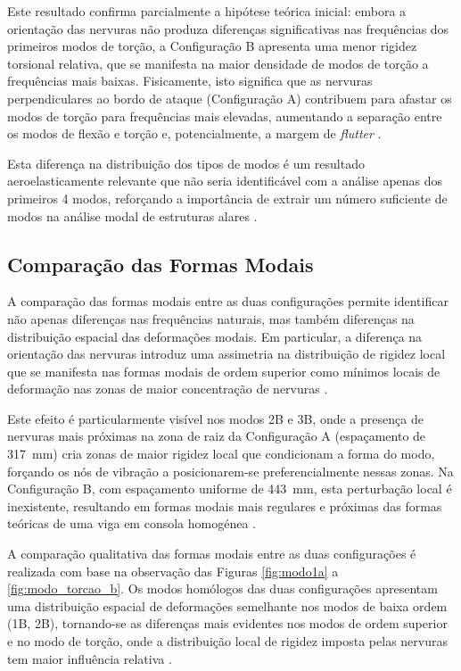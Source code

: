 \documentclass[11pt,oneside,a4paper,final]{report}
\begin{document}
Este resultado confirma parcialmente a hipótese teórica inicial: embora a orientação das nervuras não produza diferenças significativas nas frequências dos primeiros modos de torção, a Configuração B apresenta uma menor rigidez torsional relativa, que se manifesta na maior densidade de modos de torção a frequências mais baixas. Fisicamente, isto significa que as nervuras perpendiculares ao bordo de ataque (Configuração A) contribuem para afastar os modos de torção para frequências mais elevadas, aumentando a separação entre os modos de flexão e torção e, potencialmente, a margem de \textit{flutter} \cite{Fung1993, Wright2015}.

Esta diferença na distribuição dos tipos de modos é um resultado aeroelasticamente relevante que não seria identificável com a análise apenas dos primeiros 4 modos, reforçando a importância de extrair um número suficiente de modos na análise modal de estruturas alares \cite{Dowell2004, Craig2006}.

\subsection{Comparação das Formas Modais}

A comparação das formas modais entre as duas configurações permite identificar não apenas diferenças nas frequências naturais, mas também diferenças na distribuição espacial das deformações modais. Em particular, a diferença na orientação das nervuras introduz uma assimetria na distribuição de rigidez local que se manifesta nas formas modais de ordem superior como mínimos locais de deformação nas zonas de maior concentração de nervuras \cite{Bathe2014, Cook2001}.

Este efeito é particularmente visível nos modos 2B e 3B, onde a presença de nervuras mais próximas na zona de raiz da Configuração A (espaçamento de \SI{317}{\milli\meter}) cria zonas de maior rigidez local que condicionam a forma do modo, forçando os nós de vibração a posicionarem-se preferencialmente nessas zonas. Na Configuração B, com espaçamento uniforme de \SI{443}{\milli\meter}, esta perturbação local é inexistente, resultando em formas modais mais regulares e próximas das formas teóricas de uma viga em consola homogénea \cite{Rao2011}.

A comparação qualitativa das formas modais entre as duas configurações é realizada com base na observação das Figuras \ref{fig:modo1a} a \ref{fig:modo_torcao_b}. Os modos homólogos das duas configurações apresentam uma distribuição espacial de deformações semelhante nos modos de baixa ordem (1B, 2B), tornando-se as diferenças mais evidentes nos modos de ordem superior e no modo de torção, onde a distribuição local de rigidez imposta pelas nervuras tem maior influência relativa \cite{Bisplinghoff1996, Dowell2004}.
\end{document}
